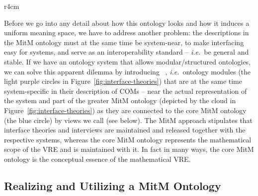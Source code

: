 \begin{wrapfigure}r{4cm}\vspace*{-1.5em}
  \vspace*{-.5em}
  \caption{Interface theories}\label{fig:interface-theories}\vspace*{-1em}
\end{wrapfigure}
Before we go into any detail about how this ontology looks and how it induces a uniform
meaning space, we have to address another problem: the descriptions in the MitM ontology
must at the same time be system-near, to make interfacing easy for systems, and serve as
an interoperability standard -- \emph{i.e.}\ be general and stable. If we have an ontology system
that allows modular/structured ontologies, we can solve this apparent dilemma by
introducing ~\cite{KohRabSac:fvip11}, \emph{i.e.}\ ontology modules
(the light purple circles in Figure~\ref{fig:interface-theories}) that are at the same
time system-specific in their description of COMs -- near the actual representation of the
system and part of the greater MitM ontology (depicted by the cloud in
Figure~\ref{fig:interface-theories}) as they are connected to the core MitM ontology (the
blue circle) by views we call  (see below). The MitM approach
stipulates that interface theories and interviews are maintained and released together with
the respective systems, whereas the core MitM ontology represents the mathematical scope
of the VRE and is maintained with it. In fact in many ways, the core MitM ontology is the
conceptual essence of the mathematical VRE.

\subsection{Realizing and Utilizing a MitM Ontology}


